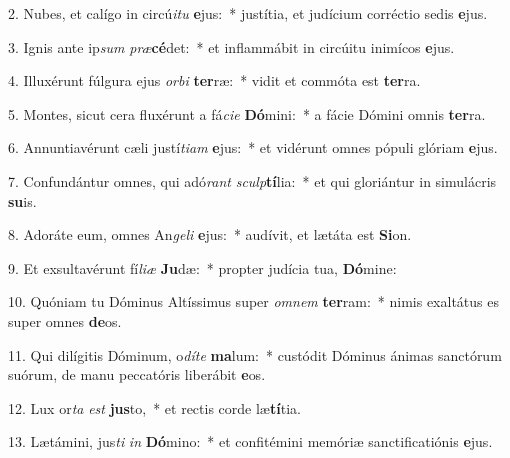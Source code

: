 2. Nubes, et calígo in circú\textit{i}\textit{tu} \textbf{e}jus:~*  justítia, et judícium corréctio sedis \textbf{e}jus.\

3. Ignis ante ip\textit{sum} \textit{præ}\textbf{cé}det:~*  et inflammábit in circúitu inimícos \textbf{e}jus.\

4. Illuxérunt fúlgura ejus \textit{or}\textit{bi} \textbf{ter}ræ:~*  vidit et commóta est \textbf{ter}ra.\

5. Montes, sicut cera fluxérunt a fá\textit{ci}\textit{e} \textbf{Dó}mini:~*  a fácie Dómini omnis \textbf{ter}ra.\

6. Annuntiavérunt cæli justí\textit{ti}\textit{am} \textbf{e}jus:~*  et vidérunt omnes pópuli glóriam \textbf{e}jus.\

7. Confundántur omnes, qui adó\textit{rant} \textit{sculp}\textbf{tí}lia:~*  et qui gloriántur in simulácris \textbf{su}is.\

8. Adoráte eum, omnes An\textit{ge}\textit{li} \textbf{e}jus:~*  audívit, et lætáta est \textbf{Si}on.\

9. Et exsultavérunt fí\textit{li}\textit{æ} \textbf{Ju}dæ:~*  propter judícia tua, \textbf{Dó}mine:\

10. Quóniam tu Dóminus Altíssimus super \textit{om}\textit{nem} \textbf{ter}ram:~*  nimis exaltátus es super omnes \textbf{de}os.\

11. Qui dilígitis Dóminum, o\textit{dí}\textit{te} \textbf{ma}lum:~*  custódit Dóminus ánimas sanctórum suórum, de manu peccatóris liberábit \textbf{e}os.\

12. Lux or\textit{ta} \textit{est} \textbf{jus}to,~*  et rectis corde læ\textbf{tí}tia.\

13. Lætámini, jus\textit{ti} \textit{in} \textbf{Dó}mino:~*  et confitémini memóriæ sanctificatiónis \textbf{e}jus.\

